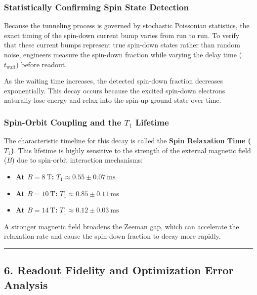 \documentclass[
]{article}
\providecommand{\tightlist}{%
  \setlength{\itemsep}{0pt}\setlength{\parskip}{0pt}}
\begin{document}
\subsubsection{Statistically Confirming Spin State
Detection}\label{statistically-confirming-spin-state-detection}

Because the tunneling process is governed by stochastic Poissonian
statistics, the exact timing of the spin-down current bump varies from
run to run. To verify that these current bumps represent true spin-down
states rather than random noise, engineers measure the spin-down
fraction while varying the delay time (\(t_{\text{wait}}\)) before
readout.

As the waiting time increases, the detected spin-down fraction decreases
exponentially. This decay occurs because the excited spin-down electrons
naturally lose energy and relax into the spin-up ground state over time.

\subsubsection{\texorpdfstring{Spin-Orbit Coupling and the \(T_1\)
Lifetime}{Spin-Orbit Coupling and the T\_1 Lifetime}}\label{spin-orbit-coupling-and-the-t_1-lifetime}

The characteristic timeline for this decay is called the \textbf{Spin
Relaxation Time (\(T_1\))}. This lifetime is highly sensitive to the
strength of the external magnetic field (\(B\)) due to spin-orbit
interaction mechanisms:

\begin{itemize}
\tightlist
\item
  \textbf{At \(B = 8\ \text{T}\):}
  \(T_1 \approx 0.55 \pm 0.07\ \text{ms}\)
\item
  \textbf{At \(B = 10\ \text{T}\):}
  \(T_1 \approx 0.85 \pm 0.11\ \text{ms}\)
\item
  \textbf{At \(B = 14\ \text{T}\):}
  \(T_1 \approx 0.12 \pm 0.03\ \text{ms}\)
\end{itemize}

A stronger magnetic field broadens the Zeeman gap, which can accelerate
the relaxation rate and cause the spin-down fraction to decay more
rapidly.

\begin{center}\rule{0.5\linewidth}{0.5pt}\end{center}

\subsection{6. Readout Fidelity and Optimization Error
Analysis}\label{readout-fidelity-and-optimization-error-analysis}
\end{document}
